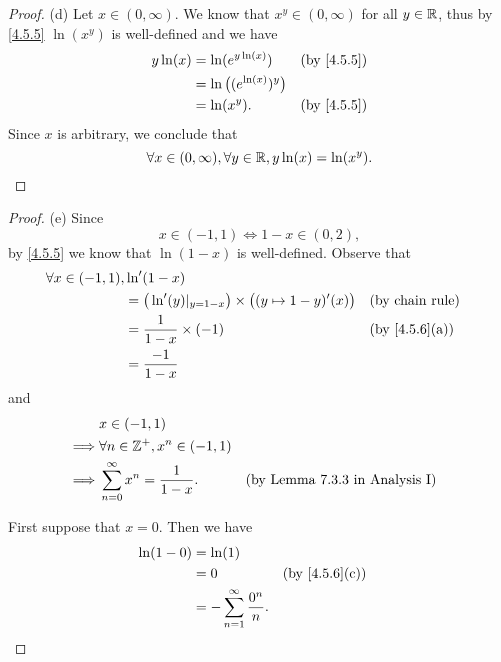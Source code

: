 \begin{proof}{(d)}
  Let \(x \in (0, \infty)\).
  We know that \(x^y \in (0, \infty)\) for all \(y \in \mathbb{R}\), thus by \cref{4.5.5} \(\ln(x^y)\) is well-defined and we have
  \begin{align*}
    y \ln(x) & = \ln(e^{y \ln(x)})             &  & \by{4.5.5} \\
             & = \ln\big((e^{\ln(x)})^{y}\big)                 \\
             & = \ln(x^y).                     &  & \by{4.5.5}
  \end{align*}
  Since \(x\) is arbitrary, we conclude that
  \[
    \forall x \in (0, \infty), \forall y \in \mathbb{R}, y \ln(x) = \ln(x^y).
  \]
\end{proof}

\begin{proof}{(e)}
  Since
  \[
    x \in (-1, 1) \iff 1 - x \in (0, 2),
  \]
  by \cref{4.5.5} we know that \(\ln(1 - x)\) is well-defined.
  Observe that
  \begin{align*}
    \forall x \in (-1, 1), & \ln'(1 - x)                                                                                              \\
                           & = \big(\ln'(y)|_{y = 1 - x}\big) \times \big((y \mapsto 1 - y)'(x)\big) &  & \text{(by chain rule)}      \\
                           & = \dfrac{1}{1 - x} \times (-1)                                          &  & \text{(by \cref{4.5.6}(a))} \\
                           & = \dfrac{-1}{1 - x}
  \end{align*}
  and
  \begin{align*}
             & x \in (-1, 1)                                                                          \\
    \implies & \forall n \in \mathbb{Z}^+, x^n \in (-1, 1)                                                    \\
    \implies & \sum_{n = 0}^\infty x^n = \dfrac{1}{1 - x}. &  & \text{(by Lemma 7.3.3 in Analysis I)}
  \end{align*}

  First suppose that \(x = 0\).
  Then we have
  \begin{align*}
    \ln(1 - 0) & = \ln(1)                                                                 \\
               & = 0                                     &  & \text{(by \cref{4.5.6}(c))} \\
               & = - \sum_{n = 1}^\infty \dfrac{0^n}{n}.
  \end{align*}


\end{proof}
